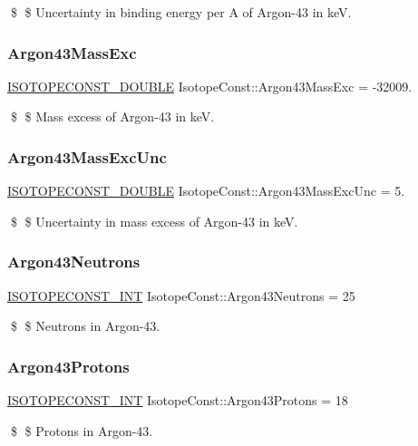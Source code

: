 \$ \$ Uncertainty in binding energy per A of Argon-\/43 in keV. \mbox{\label{group___isotope_const-_argon-_ar43_gaf3342699016a54bfa93bdd1a33b09a8a}} 
\subsubsection{\texorpdfstring{Argon43\+Mass\+Exc}{Argon43MassExc}}
{\footnotesize\ttfamily \mbox{\hyperlink{group___isotope_const-_macros_ga8f45a7272ce02c0b4c65c44636ed719a}{I\+S\+O\+T\+O\+P\+E\+C\+O\+N\+S\+T\+\_\+\+D\+O\+U\+B\+LE}} Isotope\+Const\+::\+Argon43\+Mass\+Exc = -\/32009.}

\$ \$ Mass excess of Argon-\/43 in keV. \mbox{\label{group___isotope_const-_argon-_ar43_ga63bd2bfee94919cf090b193d161319c0}} 
\subsubsection{\texorpdfstring{Argon43\+Mass\+Exc\+Unc}{Argon43MassExcUnc}}
{\footnotesize\ttfamily \mbox{\hyperlink{group___isotope_const-_macros_ga8f45a7272ce02c0b4c65c44636ed719a}{I\+S\+O\+T\+O\+P\+E\+C\+O\+N\+S\+T\+\_\+\+D\+O\+U\+B\+LE}} Isotope\+Const\+::\+Argon43\+Mass\+Exc\+Unc = 5.}

\$ \$ Uncertainty in mass excess of Argon-\/43 in keV. \mbox{\label{group___isotope_const-_argon-_ar43_gafccccfe3373efc0a4931fcaf1952bd51}} 
\subsubsection{\texorpdfstring{Argon43\+Neutrons}{Argon43Neutrons}}
{\footnotesize\ttfamily \mbox{\hyperlink{group___isotope_const-_macros_ga5f18360b3e99483a35c32d789e62621c}{I\+S\+O\+T\+O\+P\+E\+C\+O\+N\+S\+T\+\_\+\+I\+NT}} Isotope\+Const\+::\+Argon43\+Neutrons = 25}

\$ \$ Neutrons in Argon-\/43. \mbox{\label{group___isotope_const-_argon-_ar43_gab367f35fd63d72019cb59cc0e25ee6e1}} 
\subsubsection{\texorpdfstring{Argon43\+Protons}{Argon43Protons}}
{\footnotesize\ttfamily \mbox{\hyperlink{group___isotope_const-_macros_ga5f18360b3e99483a35c32d789e62621c}{I\+S\+O\+T\+O\+P\+E\+C\+O\+N\+S\+T\+\_\+\+I\+NT}} Isotope\+Const\+::\+Argon43\+Protons = 18}

\$ \$ Protons in Argon-\/43. 